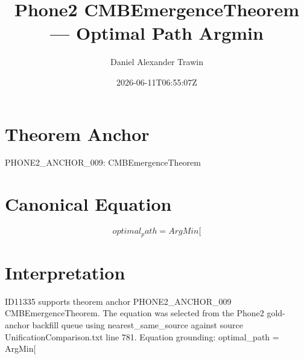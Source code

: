 \documentclass[11pt]{article}
\title{Phone2 CMBEmergenceTheorem — Optimal Path Argmin}
\author{Daniel Alexander Trawin}
\date{2026-06-11T06:55:07Z}
\begin{document}
\maketitle
\section*{Theorem Anchor}
PHONE2_ANCHOR_009: CMBEmergenceTheorem
\section*{Canonical Equation}
\[
optimal_path = ArgMin[
\]
\section*{Interpretation}
ID11335 supports theorem anchor PHONE2_ANCHOR_009 CMBEmergenceTheorem. The equation was selected from the Phone2 gold-anchor backfill queue using nearest_same_source against source UnificationComparison.txt line 781. Equation grounding: optimal_path = ArgMin[
\end{document}
